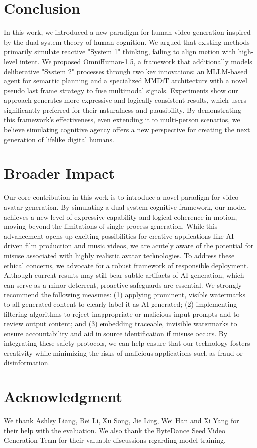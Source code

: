 \section{Conclusion}\label{sec:con}
In this work, we introduced a new paradigm for human video generation inspired by the dual-system theory of human cognition. We argued that existing methods primarily simulate reactive "System 1" thinking, failing to align motion with high-level intent. We proposed OmniHuman-1.5, a framework that additionally models deliberative "System 2" processes through two key innovations: an MLLM-based agent for semantic planning and a specialized MMDiT architecture with a novel pseudo last frame strategy to fuse multimodal signals.
Experiments show our approach generates more expressive and logically consistent results, which users significantly preferred for their naturalness and plausibility. By demonstrating this framework's effectiveness, even extending it to multi-person scenarios, we believe simulating cognitive agency offers a new perspective for creating the next generation of lifelike digital humans.


\section{Broader Impact}
Our core contribution in this work is to introduce a novel paradigm for video avatar generation. By simulating a dual-system cognitive framework, our model achieves a new level of expressive capability and logical coherence in motion, moving beyond the limitations of single-process generation. While this advancement opens up exciting possibilities for creative applications like AI-driven film production and music videos, we are acutely aware of the potential for misuse associated with highly realistic avatar technologies.
To address these ethical concerns, we advocate for a robust framework of responsible deployment. Although current results may still bear subtle artifacts of AI generation, which can serve as a minor deterrent, proactive safeguards are essential. We strongly recommend the following measures: (1) applying prominent, visible watermarks to all generated content to clearly label it as AI-generated; (2) implementing filtering algorithms to reject inappropriate or malicious input prompts and to review output content; and (3) embedding traceable, invisible watermarks to ensure accountability and aid in source identification if misuse occurs. By integrating these safety protocols, we can help ensure that our technology fosters creativity while minimizing the risks of malicious applications such as fraud or disinformation.



\section{Acknowledgment}
We thank Ashley Liang, Bei Li, Xu Song, Jie Ling, Wei Han and Xi Yang for their help with the evaluation. We also thank the ByteDance Seed Video Generation Team for their valuable discussions regarding model training.
